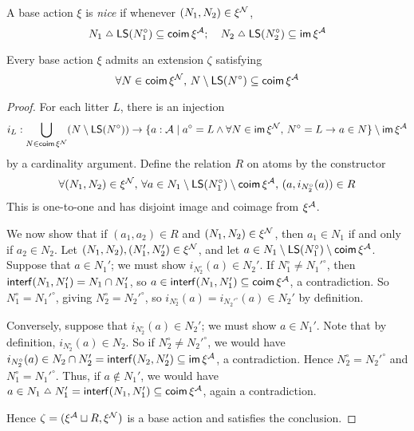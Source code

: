 \begin{definition}
  \label{def:BaseAction.Nice}
  \leanok
  A base action \( \xi \) is \emph{nice} if whenever \( (N_1, N_2) \in \xi^{\mathcal N} \),
  \[ N_1 \symmdiff \LS(N_1^\circ) \subseteq \coim \xi^\Atom;\quad N_2 \symmdiff \LS(N_2^\circ) \subseteq \im \xi^\Atom \]
\end{definition}
\begin{proposition}
  \label{prop:BaseAction.exists_inside}
  \leanok
  Every base action \( \xi \) admits an extension \( \zeta \) satisfying
  \[ \forall N \in \operatorname{\mathsf{coim}} \xi^{\mathcal N},\, N \setminus \operatorname{\mathsf{LS}}(N^\circ) \subseteq \operatorname{\mathsf{coim}} \xi^{\mathcal A} \]
\end{proposition}
\begin{proof}
  \leanok
  For each litter \( L \), there is an injection
  \[ i_L : \bigcup_{N \in \operatorname{\mathsf{coim}} \xi^{\mathcal N}} (N \setminus \operatorname{\mathsf{LS}}(N^\circ)) \to \{ a : {\mathcal A} \mid a^\circ = L \wedge \forall N \in \operatorname{\mathsf{im}} \xi^{\mathcal N},\, N^\circ = L \to a \in N \} \setminus \operatorname{\mathsf{im}} \xi^{\mathcal A} \]
  by a cardinality argument.
  Define the relation \( R \) on atoms by the constructor
  \[ \forall (N_1, N_2) \in \xi^{\mathcal N},\, \forall a \in N_1 \setminus \operatorname{\mathsf{LS}}(N_1^\circ) \setminus \operatorname{\mathsf{coim}} \xi^{\mathcal A},\, (a, i_{N_2^\circ}(a)) \in R \]
  This is one-to-one and has disjoint image and coimage from \( \xi^{\mathcal A} \).

  We now show that if \( (a_1, a_2) \in R \) and \( (N_1, N_2) \in \xi^{\mathcal N} \), then \( a_1 \in N_1 \) if and only if \( a_2 \in N_2 \).
  Let \( (N_1, N_2), (N_1', N_2') \in \xi^{\mathcal N} \), and let \( a \in N_1 \setminus \operatorname{\mathsf{LS}}(N_1^\circ) \setminus \operatorname{\mathsf{coim}} \xi^{\mathcal A} \).
  Suppose that \( a \in N_1' \); we must show \( i_{N_2^\circ}(a) \in N_2' \).
  If \( N_1^\circ \neq {N_1'}^\circ \), then \( \operatorname{\mathsf{interf}}(N_1, N_1') = N_1 \cap N_1' \), so \( a \in \operatorname{\mathsf{interf}}(N_1, N_1') \subseteq \operatorname{\mathsf{coim}} \xi^{\mathcal A} \), a contradiction.
  So \( N_1^\circ = {N_1'}^\circ \), giving \( N_2^\circ = {N_2'}^\circ \), so \( i_{N_2^\circ}(a) = i_{{N_2'}^\circ}(a) \in N_2' \) by definition.

  Conversely, suppose that \( i_{N_2^\circ}(a) \in N_2' \); we must show \( a \in N_1' \).
  Note that by definition, \( i_{N_2^\circ}(a) \in N_2 \).
  So if \( N_2^\circ \neq {N_2'}^\circ \), we would have \( i_{N_2^\circ}(a) \in N_2 \cap N_2' = \operatorname{\mathsf{interf}}(N_2, N_2') \subseteq \operatorname{\mathsf{im}} \xi^{\mathcal A} \), a contradiction.
  Hence \( N_2^\circ = {N_2'}^\circ \) and \( N_1^\circ = {N_1'}^\circ \).
  Thus, if \( a \notin N_1' \), we would have \( a \in N_1 \symmdiff N_1' = \interf(N_1, N_1') \subseteq \coim \xi^\Atom \), again a contradiction.

  Hence \( \zeta = (\xi^{\mathcal A} \sqcup R, \xi^{\mathcal N}) \) is a base action and satisfies the conclusion.
\end{proof}
